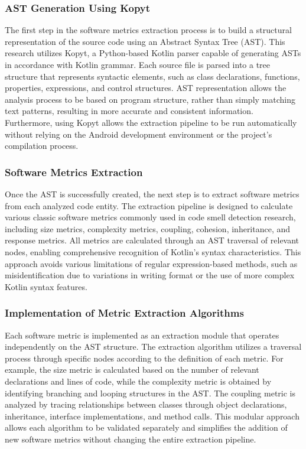 \documentclass[]{einformatica}
\begin{document}
\subsubsection{AST Generation Using Kopyt}
The first step in the software metrics extraction process is to build a structural representation of the source code using an Abstract Syntax Tree (AST). This research utilizes Kopyt, a Python-based Kotlin parser capable of generating ASTs in accordance with Kotlin grammar. Each source file is parsed into a tree structure that represents syntactic elements, such as class declarations, functions, properties, expressions, and control structures. AST representation allows the analysis process to be based on program structure, rather than simply matching text patterns, resulting in more accurate and consistent information. Furthermore, using Kopyt allows the extraction pipeline to be run automatically without relying on the Android development environment or the project's compilation process.

\subsubsection{Software Metrics Extraction}

Once the AST is successfully created, the next step is to extract software metrics from each analyzed code entity. The extraction pipeline is designed to calculate various classic software metrics commonly used in code smell detection research, including size metrics, complexity metrics, coupling, cohesion, inheritance, and response metrics. All metrics are calculated through an AST traversal of relevant nodes, enabling comprehensive recognition of Kotlin's syntax characteristics. This approach avoids various limitations of regular expression-based methods, such as misidentification due to variations in writing format or the use of more complex Kotlin syntax features.

\subsubsection{Implementation of Metric Extraction Algorithms}

Each software metric is implemented as an extraction module that operates independently on the AST structure. The extraction algorithm utilizes a traversal process through specific nodes according to the definition of each metric. For example, the size metric is calculated based on the number of relevant declarations and lines of code, while the complexity metric is obtained by identifying branching and looping structures in the AST. The coupling metric is analyzed by tracing relationships between classes through object declarations, inheritance, interface implementations, and method calls. This modular approach allows each algorithm to be validated separately and simplifies the addition of new software metrics without changing the entire extraction pipeline.
\end{document}
